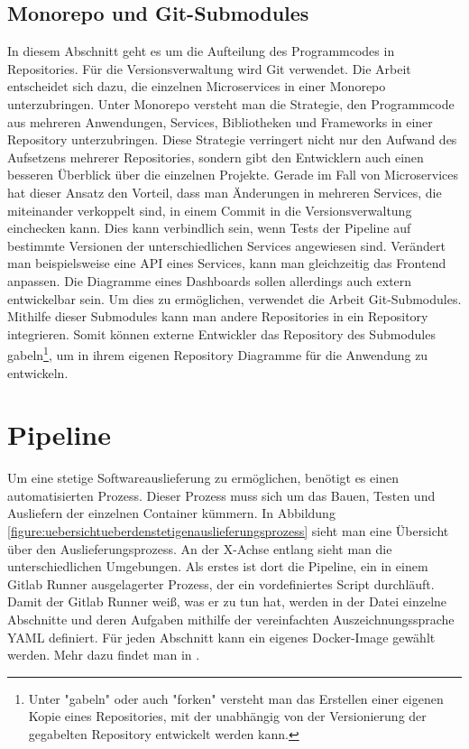 \subsection{Monorepo und Git-Submodules}
\label{subsec:monorepoundsubmodules}
In diesem Abschnitt geht es um die Aufteilung des
Programmcodes in Repositories. Für die Versionsverwaltung
wird Git verwendet. Die Arbeit entscheidet sich dazu,
die einzelnen Microservices in einer Monorepo unterzubringen.
Unter Monorepo versteht man die Strategie, den Programmcode
aus mehreren Anwendungen, Services, Bibliotheken und Frameworks
in einer Repository unterzubringen.\cite{MonorepoTrunkBasedDevelopment}
Diese Strategie verringert nicht nur den Aufwand
des Aufsetzens mehrerer Repositories, sondern gibt den
Entwicklern auch einen besseren Überblick über die einzelnen
Projekte. Gerade im Fall von Microservices hat dieser
Ansatz den Vorteil, dass man Änderungen in mehreren Services,
die miteinander verkoppelt sind, in einem Commit in die
Versionsverwaltung einchecken kann. Dies kann verbindlich sein,
wenn Tests der Pipeline auf bestimmte Versionen der unterschiedlichen
Services angewiesen sind. Verändert man beispielsweise
eine API eines Services, kann man gleichzeitig das Frontend
anpassen. Die Diagramme eines Dashboards sollen allerdings
auch extern entwickelbar sein. Um dies zu ermöglichen, verwendet
die Arbeit Git-Submodules.\cite{GitsubmodulesGitSCM} Mithilfe dieser Submodules
kann man andere Repositories in ein Repository integrieren. Somit können externe Entwickler das Repository des
Submodules gabeln\footnote{Unter "gabeln" oder auch "forken" versteht man
das Erstellen einer eigenen Kopie eines Repositories, mit der unabhängig von
der Versionierung der gegabelten Repository entwickelt werden kann.},
um in ihrem eigenen Repository Diagramme für die Anwendung zu entwickeln.



\section{Pipeline}
\label{sec:pipeline}
Um eine stetige Softwareauslieferung zu ermöglichen, benötigt es einen automatisierten
Prozess. Dieser Prozess muss sich um das Bauen, Testen und Ausliefern der einzelnen
Container kümmern. In Abbildung \ref{figure:uebersichtueberdenstetigenauslieferungsprozess}
sieht man eine Übersicht über den Auslieferungsprozess. An der X-Achse entlang sieht
man die unterschiedlichen Umgebungen. Als erstes ist dort die Pipeline, ein in einem
Gitlab Runner ausgelagerter Prozess, der ein vordefiniertes Script durchläuft.
Damit der Gitlab Runner weiß, was er zu tun hat, werden in der 
Datei einzelne Abschnitte und deren Aufgaben mithilfe der vereinfachten
Auszeichnungssprache YAML definiert. Für jeden Abschnitt kann ein eigenes Docker-Image
gewählt werden. Mehr dazu findet man in .

